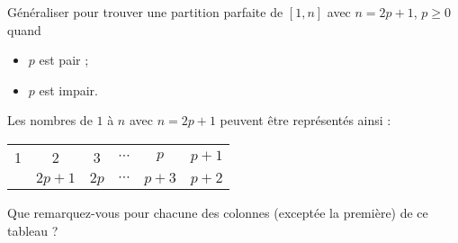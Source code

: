 \documentclass[11pt]{article}
\begin{document}


    

  \begin{exercice}{}
    Généraliser pour trouver une partition parfaite de $[1, n]$ avec $n=2p + 1$, $p \geq 0$ quand 
    \begin{itemize}
      \item $p$ est pair ;
      \item $p$ est impair.
    \end{itemize}
  \end{exercice}

  \begin{indice}
    Les nombres de $1$ à $n$ avec $n = 2p + 1$ peuvent être représentés ainsi :

    \begin{tabular}{|*{6}{c |}}
      \hline
      1 & 2 & 3 & $\cdots$ & $p$ & $p + 1$\\
      & $2p + 1$ & $2p$ & $\cdots$ & $p+3$ & $p+2$\\\hline
    \end{tabular}
    
    Que remarquez-vous pour chacune des colonnes (exceptée la première) de ce tableau ?
  \end{indice}
\end{document}
